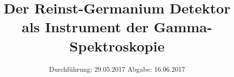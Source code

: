 

\subject{V 18}
\title{Der Reinst-Germanium Detektor als Instrument der Gamma-Spektroskopie}
\date{
  Durchführung: 29.05.2017
  \hspace{3em}
  Abgabe: 16.06.2017
}



\maketitle
\thispagestyle{empty}
\tableofcontents
\newpage






\printbibliography


